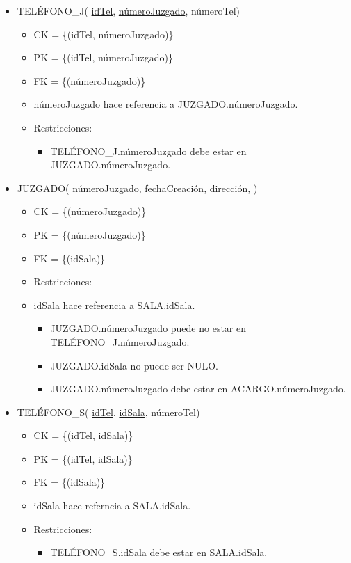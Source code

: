 \begin{itemize}

\item TELÉFONO\_J( \underline{idTel}, \underline{númeroJuzgado}, númeroTel) 
	\begin{itemize}
		\item CK = \{(idTel, númeroJuzgado)\}
		\item PK = \{(idTel, númeroJuzgado)\}
		\item FK = \{(númeroJuzgado)\}
		\item númeroJuzgado hace referencia a JUZGADO.númeroJuzgado.
		\item Restricciones:
			\begin{itemize}
			\item  TELÉFONO\_J.númeroJuzgado debe estar en JUZGADO.númeroJuzgado.
			\\
			
			\end{itemize}
	\end{itemize}	

	
\item JUZGADO( \underline{númeroJuzgado}, fechaCreación, dirección, )
	\begin{itemize}
		\item CK = \{(númeroJuzgado)\}
		\item PK = \{(númeroJuzgado)\}
		\item FK = \{(idSala)\}
		\item Restricciones:
		\item idSala hace referencia a SALA.idSala.
			\begin{itemize}
			\item JUZGADO.númeroJuzgado puede no estar en TELÉFONO\_J.númeroJuzgado.
			\item JUZGADO.idSala no puede ser NULO.
			\item JUZGADO.númeroJuzgado debe estar en ACARGO.númeroJuzgado.
			\\
			\end{itemize}
	\end{itemize}


\item TELÉFONO\_S( \underline{idTel}, \underline{idSala}, númeroTel) 
	\begin{itemize}
		\item CK = \{(idTel, idSala)\}
		\item PK = \{(idTel, idSala)\}
		\item FK = \{(idSala)\}
		\item idSala hace referncia a SALA.idSala.
		\item Restricciones:
			\begin{itemize}
			\item TELÉFONO\_S.idSala debe estar en  SALA.idSala.
			\\
			\end{itemize}
	\end{itemize}



\end{itemize}

